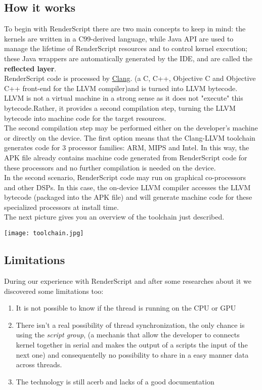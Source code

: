 \documentclass[11pt,english]{article}
\begin{document}
\subsection{How it works}
To begin with RenderScript there are two main concepts to keep in mind: the kernels are written in a C99-derived language, while Java API are used to manage the lifetime of RenderScript resources and to control kernel execution; these Java wrappers are automatically generated by the IDE, and are called the \textbf{reflected layer}.\\RenderScript code is processed by \href{http://clang.llvm.org/}{Clang}. (a C, C++, Objective C and Objective C++ front-end for the LLVM compiler)and is turned into LLVM bytecode. LLVM is not a virtual machine in a strong sense as it does not "execute" this bytecode.Rather, it provides a second compilation step, turning the LLVM bytecode into machine code for the target resources.\\The second compilation step may be performed either on the developer's machine or directly on the device. The first option means that the Clang-LLVM toolchain generates code for 3 processor families: ARM, MIPS and Intel. In this way, the APK file already contains machine code generated from RenderScript code for these processors and no further compilation is needed on the device.\\In the second scenario, RenderScript code may run on graphical co-processors and other DSPs. In this case, the on-device LLVM compiler accesses the LLVM bytecode (packaged into the APK file) and will generate machine code for these specialized processors at install time.\cite{mlwa}\\The next picture gives you an overview of the toolchain just described.
\begin{center}
\texttt{[image: toolchain.jpg]}
\end{center}
 
\subsection{Limitations}
During our experience with RenderScript and after some researches about it we discovered some limitations too:
\begin{enumerate}
\item It is not possible to know if the thread is running on the CPU or GPU  
\item There isn't a real possibility of thread synchronization, the only chance is using the \textit{script group}, (a mechanis that allow the developer to connects kernel together in serial and makes the output of a scripts the input of the next one) and consequentelly no possibility to share in a easy manner data across threads.
\item The technology is still acerb and lacks of a good documentation 
\end{enumerate}
\end{document}
